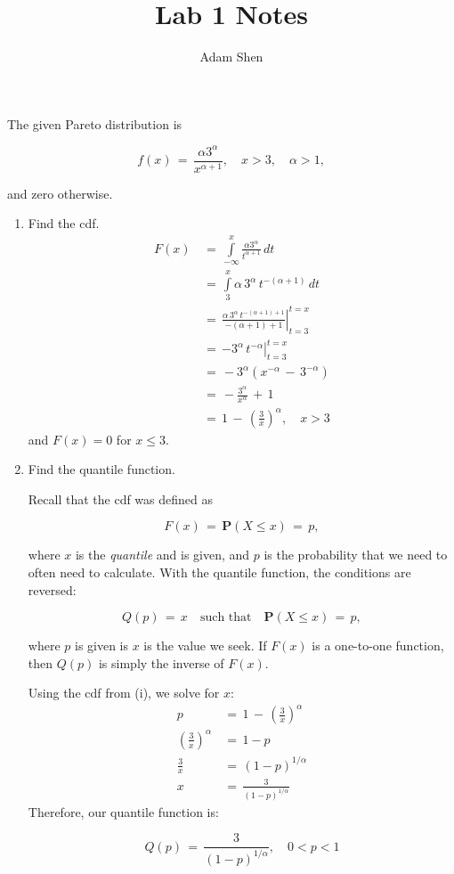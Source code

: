 \documentclass[11pt,letterpaper]{article}
\title{Lab 1 Notes}
\author{Adam Shen}
\date{}
\newcommand{\Prob}[1]{\mathbf{P}\left(#1\right)}
\newcommand{\blue}[1]{{\color{blue}#1}}
\begin{document}
\maketitle

The given Pareto distribution is

\[f(x) \,=\, \frac{\alpha 3^{\alpha}}{x^{\alpha+1}}, \quad x > 3, \quad \alpha > 1,\]

and zero otherwise.

\begin{enumerate}[label=(\roman*)]
\item Find the cdf.
\blue{
\begin{align*}
F(x) \,&=\, \int\limits_{-\infty}^{x}\frac{\alpha 3^{\alpha}}{t^{\alpha+1}}\,dt\\[3mm]
\,&=\, \int\limits_{3}^{x}\alpha\,3^{\alpha}\,t^{-(\alpha + 1)}\,dt\\[3mm]
\,&=\, \left. \frac{\alpha\,3^{\alpha}\,t^{-(\alpha + 1) + 1}}{-(\alpha + 1) + 1} \right|_{t=3}^{t=x}\\[3mm]
\,&=\, \left. -3^{\alpha}\,t^{-\alpha}\right|_{t=3}^{t=x}\\[3mm]
\,&=\, -3^{\alpha}(x^{-\alpha} \,-\, 3^{-\alpha})\\[3mm]
\,&=\, -\frac{3^{\alpha}}{x^{\alpha}} \,+\, 1\\[3mm]
\,&=\, 1 \,-\, \left(\frac{3}{x}\right)^{\alpha}, \quad x > 3
\end{align*}
and $F(x) = 0$ for $x \leq 3$.
}

\item Find the quantile function.

Recall that the cdf was defined as

\[F(x) \,=\, \Prob{X \leq x} \,=\, p,\]

where $x$ is the \emph{quantile} and is given, and $p$ is the probability that we need to often
need to calculate. With the quantile function, the conditions are reversed:

\[Q(p) \,=\, x \quad\text{such that}\quad \Prob{X \leq x} \,=\, p,\]

where $p$ is given is $x$ is the value we seek. If $F(x)$ is a one-to-one function, then $Q(p)$ is
simply the inverse of $F(x)$.

\blue{
Using the cdf from (i), we solve for $x$:
\begin{align*}
p \,&=\, 1 \,-\, \left(\frac{3}{x}\right)^{\alpha}\\[3mm]
\left(\frac{3}{x}\right)^{\alpha} \,&=\, 1-p\\[3mm]
\frac{3}{x} \,&=\, (1-p)^{1/\alpha}\\[3mm]
x \,&=\, \frac{3}{(1-p)^{1/\alpha}}
\end{align*}
Therefore, our quantile function is:

\[Q(p) \,=\, \frac{3}{(1-p)^{1/\alpha}}, \quad 0 < p < 1\]
}
\end{enumerate}
\end{document}
